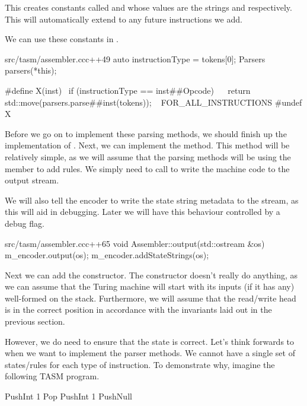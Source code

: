 This creates constants called  and  whose values are the strings  and  respectively. This will automatically extend to any future instructions we add.

We can use these constants in .

\begin{file}{src/tasm/assembler.cc}{c++}{49}
    auto instructionType = tokens[0];
    Parsers parsers(*this);

#define X(inst)                                        \
    if (instructionType == inst##Opcode)               \
    {                                                  \
        return std::move(parsers.parse##inst(tokens)); \
    }
    FOR_ALL_INSTRUCTIONS
#undef X
\end{file}

Before we go on to implement these parsing methods, we should finish up the implementation of . Next, we can implement the  method. This method will be relatively simple, as we will assume that the parsing methods will be using the  member to add rules. We simply need to call  to write the machine code to the output stream.

We will also tell the encoder to write the state string metadata to the stream, as this will aid in debugging. Later we will have this behaviour controlled by a debug flag.

\begin{file}{src/tasm/assembler.cc}{c++}{65}
void Assembler::output(std::ostream &os)
{
    m_encoder.output(os);
    m_encoder.addStateStrings(os);
}
\end{file}

Next we can add the constructor. The constructor doesn't really do anything, as we can assume that the Turing machine will start with its inputs (if it has any) well-formed on the stack. Furthermore, we will assume that the read/write head is in the correct position in accordance with the invariants laid out in the previous section.

However, we do need to ensure that the state is correct. Let's think forwards to when we want to implement the parser methods. We cannot have a single set of states/rules for each type of instruction. To demonstrate why, imagine the following TASM program.

\begin{stdout}
PushInt 1
Pop
PushInt 1
PushNull
\end{stdout}

